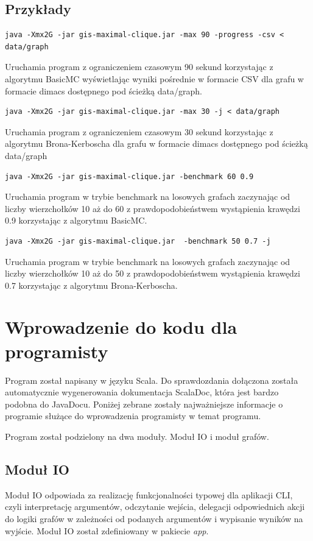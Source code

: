 \documentclass[12pt, a4paper]{article}
\begin{document}
\subsection{Przykłady}

\begin{verbatim}
java -Xmx2G -jar gis-maximal-clique.jar -max 90 -progress -csv < data/graph
\end{verbatim}
Uruchamia program z ograniczeniem czasowym 90 sekund korzystając z algorytmu BasicMC wyświetlając wyniki pośrednie w formacie CSV dla grafu w formacie dimacs dostępnego pod ścieżką data/graph.

\begin{verbatim}
java -Xmx2G -jar gis-maximal-clique.jar -max 30 -j < data/graph 
\end{verbatim}
Uruchamia program z ograniczeniem czasowym 30 sekund korzystając z algorytmu Brona-Kerboscha dla grafu w formacie dimacs dostępnego pod ścieżką data/graph

\begin{verbatim}
java -Xmx2G -jar gis-maximal-clique.jar -benchmark 60 0.9
\end{verbatim}
Uruchamia program w trybie benchmark na losowych grafach zaczynając od liczby wierzchołków 10 aż do 60 z prawdopodobieństwem wystąpienia krawędzi 0.9 korzystając z algorytmu BasicMC.

\begin{verbatim}
java -Xmx2G -jar gis-maximal-clique.jar  -benchmark 50 0.7 -j
\end{verbatim}
Uruchamia program w trybie benchmark na losowych grafach zaczynając od liczby wierzchołków 10 aż do 50 z prawdopodobieństwem wystąpienia krawędzi 0.7 korzystając z algorytmu Brona-Kerboscha.

\section{Wprowadzenie do kodu dla programisty}
Program został napisany w języku Scala. Do sprawdozdania dołączona została automatycznie wygenerowania dokumentacja ScalaDoc, która jest bardzo podobna do JavaDocu. Poniżej zebrane zostały najważniejsze informacje o programie służące do wprowadzenia programisty w temat programu.

Program został podzielony na dwa moduły. Moduł IO i moduł grafów. 

\subsection{Moduł IO}
Moduł IO odpowiada za realizację funkcjonalności typowej dla aplikacji CLI, czyli interpretację argumentów, odczytanie wejścia, delegacji odpowiednich akcji do logiki grafów w zależności od podanych argumentów i wypisanie wyników na wyjście. Moduł IO został zdefiniowany w pakiecie \emph{app}.
\end{document}
